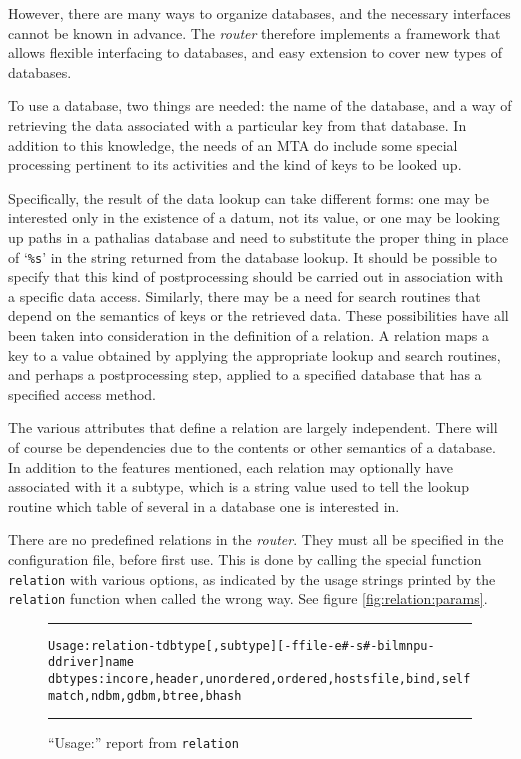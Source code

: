 However, there are many ways to organize databases, and the necessary
interfaces cannot be known in advance.  The {\em router} therefore implements a
framework that allows flexible interfacing to databases, and easy extension
to cover new types of databases.

To use a database, two things are needed: the name of the database, and a
way of retrieving the data associated with a particular key from that
database.  In addition to this knowledge, the needs of an MTA do include
some special processing pertinent to its activities and the kind of keys to
be looked up.

Specifically, the result of the data lookup can take different forms: one
may be interested only in the existence of a datum, not its value, or one
may be looking up paths in a pathalias database and need to substitute the
proper thing in place of `{\tt \%s}' in the string returned from the database
lookup.  It should be possible to specify that this kind of postprocessing
should be carried out in association with a specific data access.
Similarly, there may be a need for search routines that depend on the
semantics of keys or the retrieved data.  These possibilities have all been
taken into consideration in the definition of a relation.  A relation maps
a key to a value obtained by applying the appropriate lookup and search
routines, and perhaps a postprocessing step, applied to a specified
database that has a specified access method.

The various attributes that define a relation are largely independent.
There will of course be dependencies due to the contents or other semantics
of a database.  In addition to the features mentioned, each relation may
optionally have associated with it a subtype, which is a string value used
to tell the lookup routine which table of several in a database
one is interested in.

There are no predefined relations in the {\em router}.
They must all be specified in the configuration file,
before first use.
This is done by calling the special function {\tt relation} with
various options, as indicated by the usage strings printed by
the {\tt relation} function when called the wrong way.
See figure \vref{fig:relation:params}.

\begin{figure*}
\begin{alltt}\medskip\hrule\small\medskip
Usage: relation -t dbtype[,subtype] [-f file -e# -s# -bilmnpu -d driver] name
  dbtypes: incore,header,unordered,ordered,hostsfile,bind,selfmatch,ndbm,gdbm,btree,bhash
\medskip\hrule\end{alltt}\medskip
\caption{\label{fig:relation:params}``Usage:'' report from {\tt relation}} 
\end{figure*}

